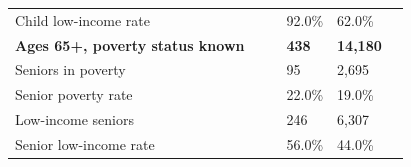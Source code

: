 \documentclass[9pt]{report}
\begin{document}
\begin{tabular}{p{.10in}p{.10in}p{.10in}p{3.7in}>{\hfill}p{.85in}>{\hfill}p{.85in}>{\hfill}p{.85in}>{\hfill}p{.85in}p{0.1in}}
\multicolumn{4}{l}{\parbox{3.6in}{\strut\raggedright{{Child low-income rate}}\strut}} &  &  & 92.0\% & 62.0\% & \multicolumn{1}{l}{}  \\ 
\multicolumn{4}{l}{\parbox{3.5in}{\strut\raggedright{\textbf{Ages 65+, poverty status known}\strut}}} & \textbf{} & \textbf{} & \textbf{438} & \textbf{14,180} & \textbf{} \\ 
\multicolumn{4}{l}{\parbox{3.6in}{\strut\raggedright{{Seniors in poverty}}\strut}} &  &  & 95 & 2,695 & \multicolumn{1}{l}{}  \\ 
\multicolumn{4}{l}{\parbox{3.6in}{\strut\raggedright{{Senior poverty rate}}\strut}} &  &  & 22.0\% & 19.0\% & \multicolumn{1}{l}{}  \\ 
\multicolumn{4}{l}{\parbox{3.6in}{\strut\raggedright{{Low-income seniors}}\strut}} &  &  & 246 & 6,307 & \multicolumn{1}{l}{}  \\ 
\multicolumn{4}{l}{\parbox{3.6in}{\strut\raggedright{{Senior low-income rate}}\strut}} &  &  & 56.0\% & 44.0\% & \multicolumn{1}{l}{}  \\ 

\end{tabular}
\setlength{\tabcolsep}{6pt} %
\end{document}
